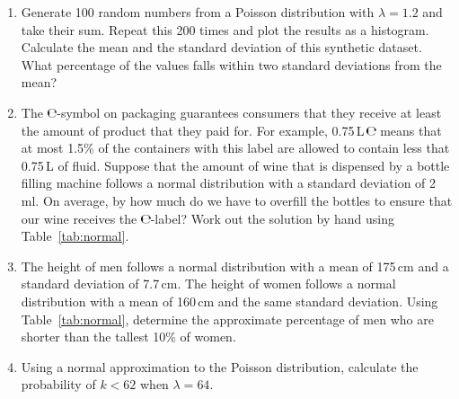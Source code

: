 \begin{enumerate}

\item Generate 100 random numbers from a Poisson distribution with
  $\lambda=1.2$ and take their sum. Repeat this 200 times and plot the
  results as a histogram. Calculate the mean and the standard
  deviation of this synthetic dataset. What percentage of the values
  falls within two standard deviations from the mean?
  
\item The \includegraphics[height=0.7em]{../figures/e.pdf}-symbol on
  packaging guarantees consumers that they receive at least the amount
  of product that they paid for. For example,
  0.75\,L\,\includegraphics[height=0.7em]{../figures/e.pdf} means that
  at most 1.5\% of the containers with this label are allowed to
  contain less that 0.75\,L of fluid.  Suppose that the amount of wine
  that is dispensed by a bottle filling machine follows a normal
  distribution with a standard deviation of 2\,ml.  On average, by how
  much do we have to overfill the bottles to ensure that our wine
  receives the \includegraphics[height=0.7em]{../figures/e.pdf}-label?
  Work out the solution by hand using Table~\ref{tab:normal}.
  
\item The height of men follows a normal distribution with a mean of
  175\,cm and a standard deviation of 7.7\,cm. The height of women
  follows a normal distribution with a mean of 160\,cm and the same
  standard deviation. Using Table~\ref{tab:normal}, determine the
  approximate percentage of men who are shorter than the tallest 10\%
  of women.

\item Using a normal approximation to the Poisson distribution,
  calculate the probability of $k<{62}$ when $\lambda=64$.
  

\end{enumerate}
